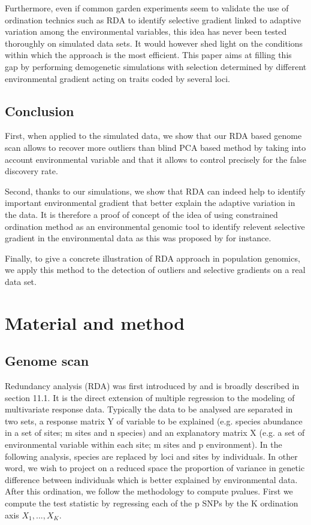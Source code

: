 \documentclass[a4paper,times,10pt,authoryear]{article}%
\begin{document}
Furthermore, even if common garden experiments seem to validate the use of ordination technics such as RDA to identify selective gradient linked to adaptive variation \citep{Steane2014a} among the environmental variables, this idea has never been tested thoroughly on simulated data sets. It would however shed light on the conditions within which the approach is the most efficient. This paper aims at filling this gap by performing demogenetic simulations with selection determined by different environmental gradient acting on traits coded by several loci.

	
\subsection{Conclusion}	
	
First, when applied to the simulated data, we show that our RDA based genome scan allows to recover more outliers than blind PCA based method by taking into account environmental variable and that it allows to control precisely for the false discovery rate. 

Second, thanks to our simulations, we show that RDA can indeed help to identify important environmental gradient that better explain the adaptive variation in the data. It is therefore a proof of concept of the idea of using constrained ordination method as an environmental genomic tool to identify relevent selective gradient in the environmental data as this was proposed by \citet{DeKort2014,Steane2014a} for instance. 

Finally, to give a concrete illustration of RDA approach in population genomics, we apply this method to the detection of outliers and selective gradients on a real data set.


\section{Material and method}

\subsection{Genome scan}

Redundancy analysis (RDA) was first introduced by \citep{Rao1964} and is broadly described in \citep{Legendre2012} section 11.1. It is the direct extension of multiple regression to the modeling of multivariate response data. Typically the data to be analysed are separated in two sets, a response matrix Y of variable to be explained (e.g. species abundance in a set of sites; m sites and n species) and an explanatory matrix X (e.g.  a set of environmental variable within each site; m sites and p environment). 
	In the following analysis, species are replaced by loci and sites by individuals. In other word, we wish to project on a reduced space the proportion of variance in genetic difference between individuals which is better explained by environmental data.
	After this ordination, we follow the \citet{Luu2016} methodology to compute pvalues. First we compute the test statistic by regressing each of the p SNPs by the K ordination axis $X_1, ..., X_K$.
\end{document}
